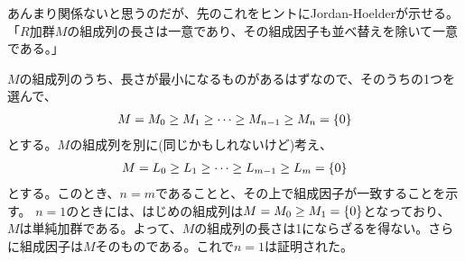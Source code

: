 \documentclass[9pt]{ltjsarticle}
\begin{document}
あんまり関係ないと思うのだが、先のこれをヒントにJordan-Hoelderが示せる。
「$R$加群$M$の組成列の長さは一意であり、その組成因子も並べ替えを除いて一意である。」
\begin{myproof}
  $M$の組成列のうち、長さが最小になるものがあるはずなので、そのうちの1つを選んで、
  \begin{align}
    M = M_0 \ge M_1 \ge \dots \ge M_{n-1} \ge M_n = \{0\}
  \end{align}
  とする。$M$の組成列を別に(同じかもしれないけど)考え、
  \begin{align}
    M = L_0 \ge L_1 \ge \dots \ge L_{m-1} \ge L_m = \{0\}
  \end{align}
  とする。このとき、$n=m$であることと、その上で組成因子が一致することを示す。
  $n=1$のときには、はじめの組成列は$M = M_0 \ge M_1 = \{0\}$となっており、$M$は単純加群である。よって、$M$の組成列の長さは1にならざるを得ない。さらに組成因子は$M$そのものである。これで$n=1$は証明された。


\end{myproof}
\end{document}
